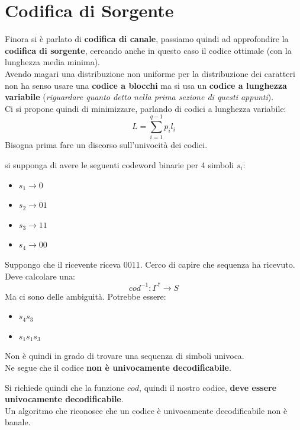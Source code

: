 \documentclass[a4paper,12pt, oneside]{book}
\begin{document}
\section{Codifica di Sorgente}
Finora si è parlato di \textbf{codifica di canale}, passiamo quindi ad
approfondire la \textbf{codifica di sorgente}, cercando anche in questo caso il
codice ottimale (con la lunghezza media minima).\\
Avendo magari una distribuzione non uniforme per la distribuzione dei caratteri
non ha senso usare una \textbf{codice a blocchi} ma si usa un 
\textbf{codice a lunghezza variabile} (\textit{riguardare quanto detto nella
  prima sezione di questi appunti}).\\
Ci si propone quindi di minimizzare, parlando di codici a lunghezza variabile:
\[L=\sum_{i=1}^{q-1} p_il_i\]
Bisogna prima fare un discorso sull'univocità dei codici.
\begin{esempio}
  si supponga di avere le seguenti codeword binarie per 4 simboli $s_i$:
  \begin{itemize}
    \item $s_1\to 0$
    \item $s_2\to 01$
    \item $s_3\to 11$
    \item $s_4\to 00$
  \end{itemize}
  Suppongo che il ricevente riceva $0011$. Cerco di capire che sequenza ha
  ricevuto. Deve calcolare una:
  \[cod^{-1}:\Gamma^*\to S\]
  Ma ci sono delle ambiguità. Potrebbe essere:
  \begin{itemize}
    \item $s_4s_3$
    \item $s_1s_1s_3$
  \end{itemize}
  Non è quindi in grado di trovare una sequenza di simboli univoca.\\
  Ne segue che il codice \textbf{non è univocamente decodificabile}.
\end{esempio}
Si richiede quindi che la funzione $cod$, quindi il nostro codice, \textbf{deve
  essere univocamente decodificabile}. \\
Un algoritmo che riconosce che un codice è univocamente decodificabile non è
banale.
\end{document}
